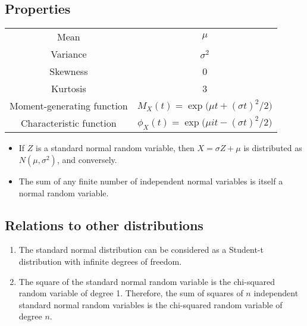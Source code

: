 \documentclass{article}
\begin{document}
\subsection*{Properties}

\begin{center}
\begin{tabular}{c|c}
Mean & $\mu$ \\
Variance & $\sigma^2$ \\
Skewness & 0 \\
Kurtosis & 3 \\
\hline
Moment-generating function & $M_X(t) = \exp\bigl(\mu t + (\sigma t)^2/2 \bigr) $ \\
Characteristic function & $\phi_X(t) = \exp\bigl(\mu i t -(\sigma t)^2/2 \bigr) $
\end{tabular}
\end{center}

\begin{itemize}
\item
If $Z$ is a standard normal random variable,
then $X = \sigma Z + \mu$ is distributed as $N(\mu, \sigma^2)$,
and conversely.
\item
The sum of any finite number of independent normal variables is itself
a normal random variable.
\end{itemize}


\subsection*{Relations to other distributions}
\begin{enumerate}
\item
The standard normal distribution can be considered as a Student-t distribution
with infinite degrees of freedom.
\item
The square of the standard normal random variable is the chi-squared random variable of degree 1.  Therefore, the sum of squares of $n$ independent standard normal random variables is the chi-squared random variable of degree $n$.
\end{enumerate}
\end{document}
